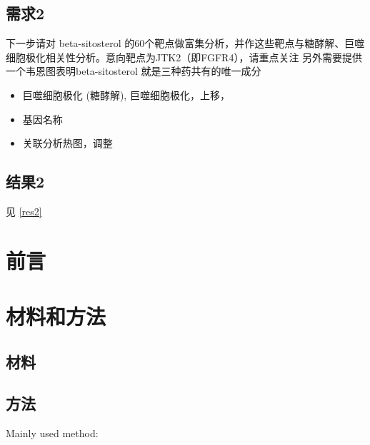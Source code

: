 \documentclass[
]{article}
\providecommand{\tightlist}{%
  \setlength{\itemsep}{0pt}\setlength{\parskip}{0pt}}
\begin{document}
\hypertarget{ux9700ux6c422}{%
\subsection{需求2}\label{ux9700ux6c422}}

下一步请对 beta-sitosterol 的60个靶点做富集分析，并作这些靶点与糖酵解、巨噬细胞极化相关性分析。意向靶点为JTK2（即FGFR4），请重点关注
另外需要提供一个韦恩图表明beta-sitosterol 就是三种药共有的唯一成分

\begin{itemize}
\tightlist
\item
  巨噬细胞极化 (糖酵解), 巨噬细胞极化，上移，
\item
  基因名称
\item
  关联分析热图，调整
\end{itemize}

\hypertarget{ux7ed3ux679c2}{%
\subsection{结果2}\label{ux7ed3ux679c2}}

见 \ref{res2}

\hypertarget{introduction}{%
\section{前言}\label{introduction}}

\hypertarget{methods}{%
\section{材料和方法}\label{methods}}

\hypertarget{ux6750ux6599}{%
\subsection{材料}\label{ux6750ux6599}}

\hypertarget{ux65b9ux6cd5}{%
\subsection{方法}\label{ux65b9ux6cd5}}

Mainly used method:
\end{document}
